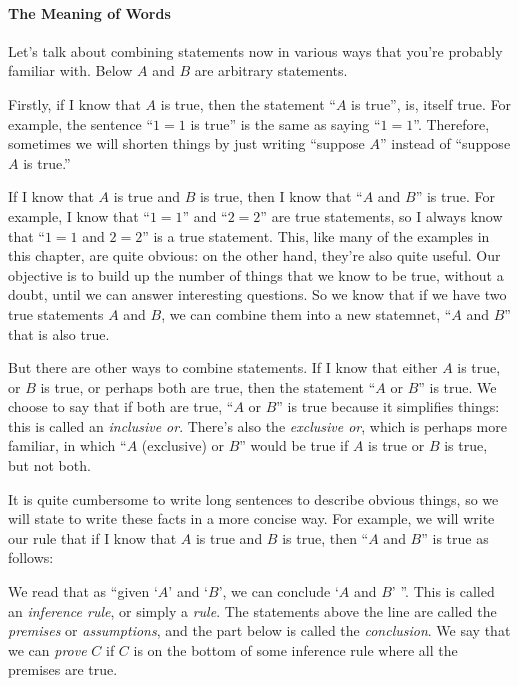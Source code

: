 \paragraph{The Meaning of Words}

Let's talk about combining statements now in various ways that you're probably familiar with.
Below $A$ and $B$ are arbitrary statements.

Firstly, if I know that $A$ is true, then the statement ``$A$ is true'', is, itself true.
For example, the sentence ``$1 = 1$ is true'' is the same as saying ``$1=1$''.
Therefore, sometimes we will shorten things by just writing ``suppose $A$'' instead of ``suppose $A$ is true.''

If I know that $A$ is true and $B$ is true, then I know that ``$A$ and $B$'' is true.
For example, I know that ``$1 = 1$'' and ``$2 = 2$'' are true statements, so I always know that ``$1 = 1$ and $2 = 2$'' is a true statement.
This, like many of the examples in this chapter, are quite obvious: on the other hand, they're also quite useful.
Our objective is to build up the number of things that we know to be true, without a doubt, until we can answer interesting questions.
So we know that if we have two true statements $A$ and $B$, we can combine them into a new statemnet, ``$A$ and $B$'' that is also true.

But there are other ways to combine statements.
If I know that either $A$ is true, or $B$ is true, or perhaps both are true, then the statement ``$A$ or $B$'' is true.
We choose to say that if both are true, ``$A$ or $B$'' is true because it simplifies things: this is called an \emph{inclusive or}.
There's also the \emph{exclusive or}, which is perhaps more familiar, in which ``$A$ (exclusive) or $B$'' would be true if $A$ is true or $B$ is true, but not both.

It is quite cumbersome to write long sentences to describe obvious things, so we will state to write these facts in a more concise way.
For example, we will write our rule that if I know that $A$ is true and $B$ is true, then ``$A$ and $B$'' is true as follows:

\begin{mathpar}
\end{mathpar}

We read that as ``given `$A$' and `$B$', we can conclude `$A$ and $B$' ''.
This is called an \emph{inference rule}, or simply a \emph{rule}.
The statements above the line are called the \emph{premises} or \emph{assumptions}, and the part below is called the \emph{conclusion}.
We say that we can \emph{prove} $C$ if $C$ is on the bottom of some inference rule where all the premises are true.

